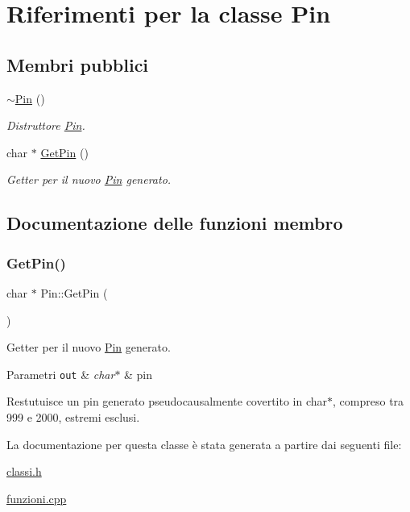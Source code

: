 \hypertarget{class_pin}{}\section{Riferimenti per la classe Pin}
\label{class_pin}
\subsection*{Membri pubblici}
\begin{DoxyCompactItemize}
\item 
\mbox{\label{class_pin_a462c14c45d3d653731dde638aa6e7bb7}} 
\mbox{\hyperlink{class_pin_a462c14c45d3d653731dde638aa6e7bb7}{$\sim$\+Pin}} ()
\begin{DoxyCompactList}\small\item\em Distruttore \mbox{\hyperlink{class_pin}{Pin}}. \end{DoxyCompactList}\item 
char $\ast$ \mbox{\hyperlink{class_pin_a9295afd45c8d2a7ac6c73dfb528c2fd2}{Get\+Pin}} ()
\begin{DoxyCompactList}\small\item\em Getter per il nuovo \mbox{\hyperlink{class_pin}{Pin}} generato. \end{DoxyCompactList}\end{DoxyCompactItemize}


\subsection{Documentazione delle funzioni membro}
\mbox{\label{class_pin_a9295afd45c8d2a7ac6c73dfb528c2fd2}} 
\subsubsection{\texorpdfstring{Get\+Pin()}{GetPin()}}
{\footnotesize\ttfamily char $\ast$ Pin\+::\+Get\+Pin (\begin{DoxyParamCaption}{ }\end{DoxyParamCaption})}



Getter per il nuovo \mbox{\hyperlink{class_pin}{Pin}} generato. 


\begin{DoxyParams}[1]{Parametri}
\mbox{\tt out}  & {\em char$\ast$} & pin\\
\hline
\end{DoxyParams}
Restutuisce un pin generato pseudocausalmente covertito in char$\ast$, compreso tra 999 e 2000, estremi esclusi. 

La documentazione per questa classe è stata generata a partire dai seguenti file\+:\begin{DoxyCompactItemize}
\item 
\mbox{\hyperlink{classi_8h}{classi.\+h}}\item 
\mbox{\hyperlink{funzioni_8cpp}{funzioni.\+cpp}}\end{DoxyCompactItemize}
